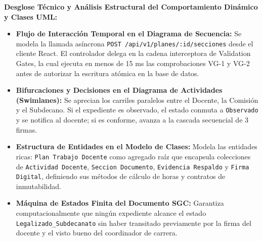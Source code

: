 \documentclass[12pt,a4paper]{article}
\begin{document}
\noindent
\noindent
\textbf{Desglose Técnico y Análisis Estructural del Comportamiento Dinámico y Clases UML:}
\begin{itemize}[leftmargin=1.5em, itemsep=3pt]
    \item \textbf{Flujo de Interacción Temporal en el Diagrama de Secuencia:} Se modela la llamada asíncrona \texttt{POST /\allowbreak  api/\allowbreak  v1/\allowbreak  planes/\allowbreak  :id/\allowbreak  secciones} desde el cliente React. El controlador delega en la cadena interceptora de Validation Gates, la cual ejecuta en menos de 15 ms las comprobaciones VG-1 y VG-2 antes de autorizar la escritura atómica en la base de datos.
    \item \textbf{Bifurcaciones y Decisiones en el Diagrama de Actividades (Swimlanes):} Se aprecian los carriles paralelos entre el Docente, la Comisión y el Subdecano. Si el expediente es observado, el estado conmuta a \texttt{Observado} y se notifica al docente; si es conforme, avanza a la cascada secuencial de 3 firmas.
    \item \textbf{Estructura de Entidades en el Modelo de Clases:} Modela las entidades ricas: \texttt{Plan Trabajo Docente} como agregado raíz que encapsula colecciones de \texttt{Actividad Docente}, \texttt{Seccion Documento}, \texttt{Evidencia Respaldo} y \texttt{Firma Digital}, definiendo sus métodos de cálculo de horas y contratos de inmutabilidad.
    \item \textbf{Máquina de Estados Finita del Documento SGC:} Garantiza computacionalmente que ningún expediente alcance el estado \texttt{Legalizado\_\allowbreak   Subdecanato} sin haber transitado previamente por la firma del docente y el visto bueno del coordinador de carrera.
\end{itemize}
\end{document}
